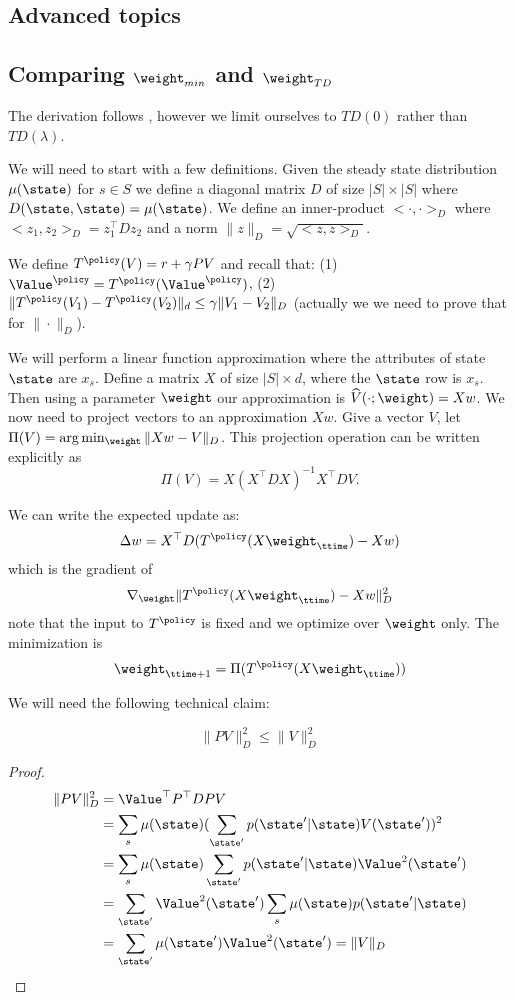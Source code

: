 \begin{leftbar}
\section{Advanced topics}
\label{sec:FA-Advanced}

\subsection{Comparing $\weight_{min}$ and $\weight_{TD}$}

The derivation follows \cite{TsitsiklisVR97}, however we limit
ourselves to $TD(0)$ rather than $TD(\lambda)$.

We will need to start with a few definitions. Given the steady state
distribution $\mu(\state)$ for $s\in S$ we define a diagonal matrix
$D$ of size $|S|\times|S|$ where $D(\state,\state)=\mu(\state)$. We
define an inner-product $<\cdot,\cdot>_D$ where
$<z_1,z_2>_D=z_1^\top Dz_2$ and a norm $\|z\|_D=\sqrt{<z,z>_D}$.

We define $T^\policy(V)= r + \gamma PV$ and recall that: (1)
$\Value^\policy = T^\policy(\Value^\policy)$, (2)
$\|T^\policy(V_1)-T^\policy(V_2)\|_d\leq \gamma \|V_1-V_2\|_D$
(actually we we need to prove that for $\|\cdot\|_D$).

We will perform a linear function approximation where the attributes
of state $\state$ are $x_s$. Define a matrix $X$ of size $|S|\times
d$, where the $\state$ row is $x_s$. Then using a parameter
$\weight$ our approximation is $\widehat{V}(\cdot;\weight)=Xw$. We
now need to project vectors to an approximation $Xw$. Give a vector
$V$, let $\Pi(V)=\arg\min_\weight \|Xw-V\|_D$. This projection
operation can be written explicitly as
\[
\Pi(V)=X(X^\top DX)^{-1}X^\top D V.
\]


We can write the expected update as:
\[
\Delta w= X^\top D(T^\policy(X\weight_\ttime)-Xw)
\]
which is the gradient of
\[
\nabla_\weight \|T^\policy(X\weight_\ttime)-Xw\|_D^2
\]
note that the input to $T^\policy$ is fixed and we optimize over
$\weight$ only. The minimization is
\[
\weight_{\ttime+1}=\Pi(T^\policy(X\weight_\ttime))
\]

We will need the following technical claim:
\begin{claim}
\[
\|PV\|_D^2\leq \|V\|_D^2
\]
\end{claim}

\begin{proof}
\begin{align*}
\|PV\|_D^2 & =\Value^\top P^\top D P V \\
&= \sum_s \mu(\state) (\sum_{\state'} p(\state'|\state) V(\state'))^2\\
&=\sum_s \mu(\state) \sum_{\state'} p(\state'|\state) \Value^2(\state')\\
&=\sum_{\state'} \Value^2(\state') \sum_s \mu(\state)p(\state'|\state)\\
&=\sum_{\state'} \mu(\state')\Value^2(\state')=\|V\|_D
\end{align*}
\end{proof}


\end{leftbar}
